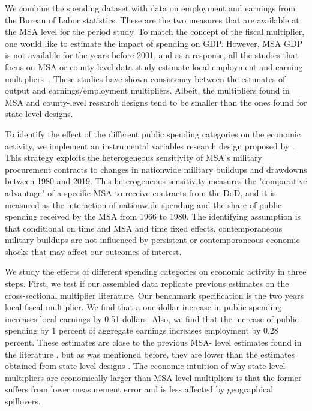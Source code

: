 \documentclass[dv_diss_main.tex]{subfiles}
\begin{document}
We combine the spending dataset with data on employment and earnings from the Bureau of Labor statistics. These are the two measures that are available at the MSA level for the period study. To match the concept of the fiscal multiplier, one would like to estimate the impact of spending on GDP. However, MSA GDP is not available for the years before 2001, and as a response, all the studies that focus on MSA or county-level data study estimate local employment and earning multipliers~\citep{suarez2016estimating, Auerbach2019,dupor2017local, Demyanyk2019}. These studies have shown consistency between the estimates of output and earnings/employment multipliers. Albeit, the multipliers found in MSA and county-level research designs tend to be smaller than the ones found for state-level designs. 

To identify the effect of the different public spending categories on the economic activity, we implement an instrumental variables research design proposed by \cite{Nakamura2014}. This strategy exploits the heterogeneous sensitivity of MSA's military procurement contracts to changes in nationwide military buildups and drawdowns between 1980 and 2019. This heterogeneous sensitivity measures the "comparative advantage" of a specific MSA to receive contracts from the DoD, and it is measured as the interaction of nationwide spending and the share of public spending received by the MSA from 1966 to 1980. The identifying assumption is that conditional on time and MSA and time fixed effects, contemporaneous military buildups are not influenced by persistent or contemporaneous economic shocks that may affect our outcomes of interest. 

We study the effects of different spending categories on economic activity in three steps. First, we test if our assembled data replicate previous estimates on the cross-sectional multiplier literature. Our benchmark specification is the two years local fiscal multiplier. We find that a one-dollar increase in public spending increases local earnings by 0.51 dollars. Also, we find that the increase of public spending by 1 percent of aggregate earnings increases employment by 0.28 percent. These estimates are close to the previous MSA- level estimates found in the literature \citep{Auerbach2019, Demyanyk2019}, but as was mentioned before, they are lower than the estimates obtained from state-level designs \citep{Nakamura2014}. The economic intuition of why state-level multipliers are economically larger than MSA-level multipliers is that the former suffers from lower measurement error and is less affected by geographical spillovers. 
\end{document}
